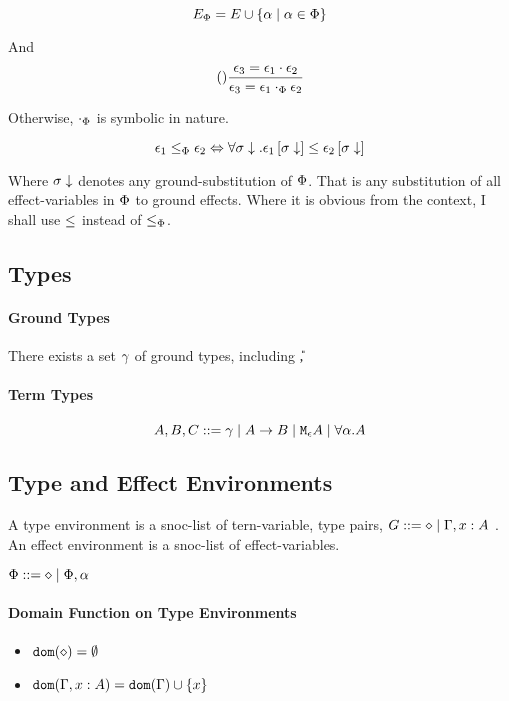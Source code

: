 {\begin{equation}
    E_\P = E \cup \left\{\a \mid \a \in \P \right\}
\end{equation}

And 
\begin{equation}
    \treerule{}{\e_3 = \e_1\dot\e_2}{\e_3 = \e_1\dotp\e_2}
\end{equation}

Otherwise, $\dotp$ is symbolic in nature.

\begin{equation}
    \e_1 \subeffectp \e_2 \Leftrightarrow \forall \si\downarrow. \e_1\sub{\si\downarrow} \subeffect \e_2\sub{\si\downarrow}
\end{equation}

Where $\si\downarrow$ denotes any ground-substitution of $\P$. That is any substitution of all effect-variables in $\P$ to ground effects. Where it is obvious from the context, I shall use $\subeffect$ instead of $\subeffectp$.


\subsection{Types}
    \paragraph{Ground Types}
        There exists a set $\ground$ of ground types, including \U, \B
    \paragraph{Term Types}
    $$ A, B, C \gens \ground \mid \ab \mid \mea \mid \all{\a}{A}$$
  
\subsection{Type and Effect Environments}
A type environment is a snoc-list of tern-variable, type pairs, $G \gens \nil \mid \gax$ .
An effect environment is a snoc-list of effect-variables.

$\P\gens\nil\mid\P, \a$
\paragraph{Domain Function on Type Environments}
\begin{itemize}
    \item $\dom{\nil} = \emptyset$
    \item $\dom{\gax} =  \dom{\G}  \cup \left\{x \right\}$
\end{itemize}

}
